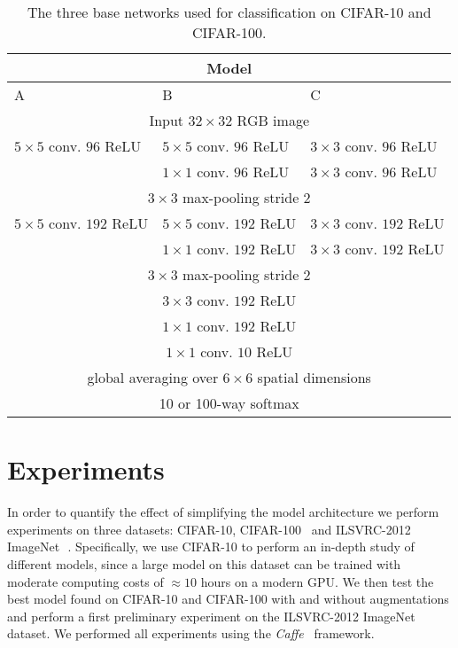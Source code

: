 \documentclass{article} \usepackage{iclr2015,times}
\begin{document}
\begin{table}[h]
\caption{The three base networks used for classification on CIFAR-10
  and CIFAR-100.}
\label{base-models}
\begin{center}
\begin{small}
\begin{tabular}{l|l|l}
\multicolumn{3}{c}{\bf Model} \\
\hline
A         &B & C \\
\hline
\multicolumn{3}{c}{Input $32 \times 32$ RGB image} \\
\hline
$5 \times 5$ conv. $96$ ReLU & $5 \times 5$ conv. $96$ ReLU & $3 \times 3$ conv. $96$ ReLU \\
 & $1 \times 1$ conv. $96$ ReLU & $3 \times 3$ conv. $96$ ReLU \\
\hline 
\multicolumn{3}{c}{$3 \times 3$ max-pooling stride $2$} \\ 
\hline
$5 \times 5$ conv. $192$ ReLU & $5 \times 5$ conv. $192$ ReLU & $3 \times 3$ conv. $192$ ReLU \\
 & $1 \times 1$ conv. $192$ ReLU & $3 \times 3$ conv. $192$ ReLU \\
\hline
\multicolumn{3}{c}{$3 \times 3$ max-pooling stride $2$} \\
\hline
\multicolumn{3}{c}{$3 \times 3$ conv. $192$ ReLU} \\
\hline
\multicolumn{3}{c}{$1 \times 1$ conv. $192$ ReLU} \\
\hline
\multicolumn{3}{c}{$1 \times 1$ conv. $10$ ReLU} \\
\hline
\multicolumn{3}{c}{global averaging over $6\times6$ spatial dimensions} \\
\hline
\multicolumn{3}{c}{10 or 100-way softmax} \\
\end{tabular}
\end{small}
\end{center}
\end{table}

\section{Experiments}
In order to quantify the effect of simplifying the model architecture
we perform experiments on three datasets: CIFAR-10, CIFAR-100~\citep{Krizhevsky2009} and ILSVRC-2012 ImageNet~\citep{Imagenet_2009}\,. Specifically, we use CIFAR-10 to perform an in-depth
study of different models, since a large model on this dataset can be trained with
moderate computing costs of $\approx 10$ hours on a modern GPU. We
then test the best model found on CIFAR-10 and CIFAR-100 with and
without augmentations and perform a first preliminary experiment on
the ILSVRC-2012 ImageNet dataset. We performed all experiments using the \emph{Caffe}~\citep{caffe} framework.
\end{document}
